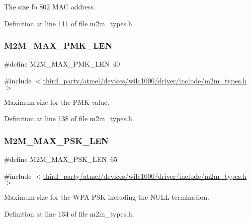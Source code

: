 The size fo 802 M\+AC address. 

Definition at line 111 of file m2m\+\_\+types.\+h.

\mbox{\label{group__WlanDefines_ga160183536c79910c9743ac0acf863e5d}} 
\subsubsection{\texorpdfstring{M2\+M\+\_\+\+M\+A\+X\+\_\+\+P\+M\+K\+\_\+\+L\+EN}{M2M\_MAX\_PMK\_LEN}}
{\footnotesize\ttfamily \#define M2\+M\+\_\+\+M\+A\+X\+\_\+\+P\+M\+K\+\_\+\+L\+EN~40}



{\ttfamily \#include $<$\hyperlink{m2m__types_8h}{third\+\_\+party/atmel/devices/wilc1000/driver/include/m2m\+\_\+types.\+h}$>$}

Maximum size for the P\+MK value. 

Definition at line 138 of file m2m\+\_\+types.\+h.

\mbox{\label{group__WlanDefines_ga790a7e0471ff8a179238863dc2021f6d}} 
\subsubsection{\texorpdfstring{M2\+M\+\_\+\+M\+A\+X\+\_\+\+P\+S\+K\+\_\+\+L\+EN}{M2M\_MAX\_PSK\_LEN}}
{\footnotesize\ttfamily \#define M2\+M\+\_\+\+M\+A\+X\+\_\+\+P\+S\+K\+\_\+\+L\+EN~65}



{\ttfamily \#include $<$\hyperlink{m2m__types_8h}{third\+\_\+party/atmel/devices/wilc1000/driver/include/m2m\+\_\+types.\+h}$>$}

Maximum size for the W\+PA P\+SK including the N\+U\+LL termination. 

Definition at line 134 of file m2m\+\_\+types.\+h.

\mbox{\label{group__WlanDefines_gab2bd95c18ede2fbc07b44c5660cc0097}} 
